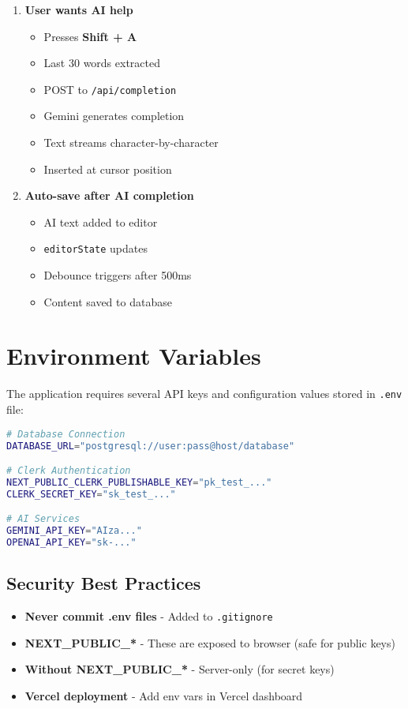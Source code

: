\documentclass[11pt,a4paper]{article}
\begin{document}
\begin{enumerate}
    \item \textbf{User wants AI help}
    \begin{itemize}
        \item Presses \textbf{Shift + A}
        \item Last 30 words extracted
        \item POST to \texttt{/api/completion}
        \item Gemini generates completion
        \item Text streams character-by-character
        \item Inserted at cursor position
    \end{itemize}
    
    \item \textbf{Auto-save after AI completion}
    \begin{itemize}
        \item AI text added to editor
        \item \texttt{editorState} updates
        \item Debounce triggers after 500ms
        \item Content saved to database
    \end{itemize}
\end{enumerate}


\section{Environment Variables}

The application requires several API keys and configuration values stored in \texttt{.env} file:

\begin{lstlisting}[language=bash]
# Database Connection
DATABASE_URL="postgresql://user:pass@host/database"

# Clerk Authentication
NEXT_PUBLIC_CLERK_PUBLISHABLE_KEY="pk_test_..."
CLERK_SECRET_KEY="sk_test_..."

# AI Services
GEMINI_API_KEY="AIza..."
OPENAI_API_KEY="sk-..."
\end{lstlisting}

\subsection{Security Best Practices}

\begin{itemize}
    \item \textbf{Never commit .env files} - Added to \texttt{.gitignore}
    \item \textbf{NEXT\_PUBLIC\_*} - These are exposed to browser (safe for public keys)
    \item \textbf{Without NEXT\_PUBLIC\_*} - Server-only (for secret keys)
    \item \textbf{Vercel deployment} - Add env vars in Vercel dashboard
\end{itemize}
\end{document}
